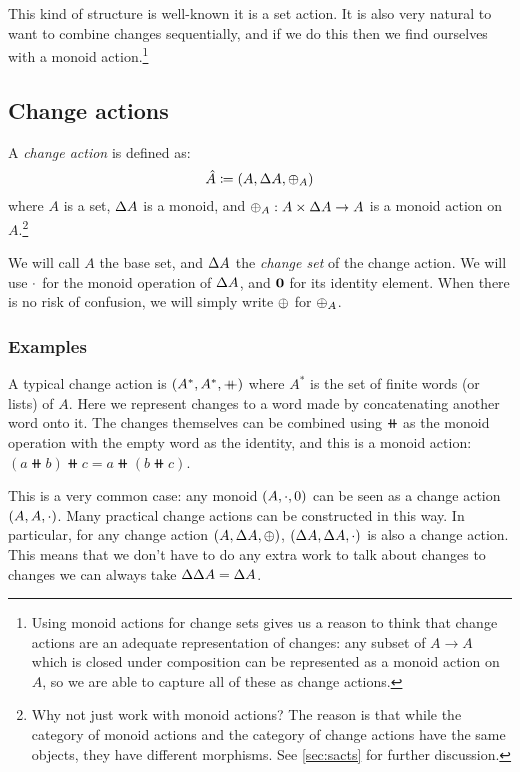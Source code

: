 This kind of structure is well-known \textemdash{} it is a set action. It is
also very natural to want to combine changes sequentially, and if we do this
then we find ourselves with a monoid action.\footnote{
Using monoid actions for change sets gives us a reason to think that
change actions are an adequate representation of changes: any subset of $A
\rightarrow A$ which is closed under composition can be
represented as a monoid action on $A$, so we are able to capture all of these as change
actions.}

\subsection{Change actions}
\label{sec:changeAction}

\begin{defn}
  A \emph{change action} is defined as:
  \begin{displaymath}
    \hat{A} \coloneqq (A,\Delta A,\oplus_A)
  \end{displaymath}
  where $A$ is a set, $\Delta A$ is a monoid, and $\oplus_A : A \times \Delta A \rightarrow A$ is a monoid action on $A$.\footnote{Why not
    just work with monoid actions? The reason is that while the category of
    monoid actions and the category of change actions have the same objects, they
  have different morphisms. See \cref{sec:sacts} for further discussion.}

  We will call $A$ the base set, and $\Delta A$ the \emph{change set} of the change
  action. We will use $\cdot$ for the monoid operation of $\Delta A$, and
  $\mathbf{0}$ for its identity element. 
  When there is no risk of confusion, we will simply write $\oplus$ for $\oplus_A$.
\end{defn}

\subsubsection{Examples}
\label{sec:examples}
A typical change action is $(A^\ast,A^\ast,\mathbin{+\mkern-10mu+})$ where $A^\ast$ is the set of finite words (or lists) of $A$. 
Here we represent changes to a word made by concatenating another word onto it. 
The changes themselves can be combined using $\doubleplus$ as the monoid operation with the empty word as the identity, 
and this is a monoid action: $(a \doubleplus b) \doubleplus c = a \doubleplus \left( b \doubleplus c \right)$.

This is a very common case: any monoid $(A, \cdot, 0)$ can be seen as a change action
$(A,A,\cdot)$. Many practical change actions
can be constructed in this way. In particular, for any change action $(A,\Delta A,\oplus)$,
$(\Delta A,\Delta A,\cdot)$ is also a change action. This means
that we don't have to do any extra work to talk about changes to changes \textemdash{} we can 
always take $\Delta \Delta A = \Delta A$.

